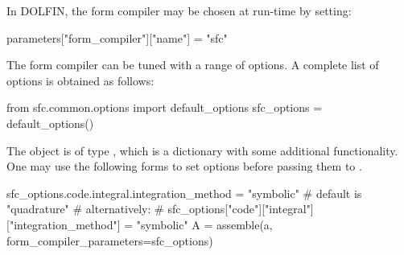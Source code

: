 In DOLFIN, the form compiler may be chosen at run-time by setting:
\begin{python}
parameters["form_compiler"]["name"] = "sfc"
\end{python}
The form compiler can be tuned with a range of options. A complete list
of options is obtained as follows:
\begin{python}
from sfc.common.options import default_options
sfc_options = default_options()
\end{python}
The object  is of type , which is a
dictionary with some additional functionality. One may use the following
forms to set options before passing them to .
\begin{python}
sfc_options.code.integral.integration_method = "symbolic" # default is "quadrature"
# alternatively:
# sfc_options["code"]["integral"]["integration_method"] = "symbolic"
A = assemble(a, form_compiler_parameters=sfc_options)
\end{python}


